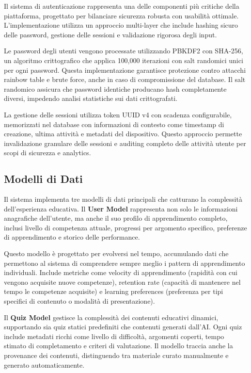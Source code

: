 \documentclass[12pt,a4paper]{article}
\begin{document}
Il sistema di autenticazione rappresenta una delle componenti più critiche della piattaforma, progettato per bilanciare sicurezza robusta con usabilità ottimale. L'implementazione utilizza un approccio multi-layer che include hashing sicuro delle password, gestione delle sessioni e validazione rigorosa degli input.

Le password degli utenti vengono processate utilizzando PBKDF2 con SHA-256, un algoritmo crittografico che applica 100,000 iterazioni con salt randomici unici per ogni password. Questa implementazione garantisce protezione contro attacchi rainbow table e brute force, anche in caso di compromissione del database. Il salt randomico assicura che password identiche producano hash completamente diversi, impedendo analisi statistiche sui dati crittografati.

La gestione delle sessioni utilizza token UUID v4 con scadenza configurabile, memorizzati nel database con informazioni di contesto come timestamp di creazione, ultima attività e metadati del dispositivo. Questo approccio permette invalidazione granulare delle sessioni e auditing completo delle attività utente per scopi di sicurezza e analytics.

\subsection{Modelli di Dati}

Il sistema implementa tre modelli di dati principali che catturano la complessità dell'esperienza educativa. Il \textbf{User Model} rappresenta non solo le informazioni anagrafiche dell'utente, ma anche il suo profilo di apprendimento completo, inclusi livello di competenza attuale, progressi per argomento specifico, preferenze di apprendimento e storico delle performance.

Questo modello è progettato per evolversi nel tempo, accumulando dati che permettono al sistema di comprendere sempre meglio i pattern di apprendimento individuali. Include metriche come velocity di apprendimento (rapidità con cui vengono acquisite nuove competenze), retention rate (capacità di mantenere nel tempo le competenze acquisite) e learning preferences (preferenza per tipi specifici di contenuto o modalità di presentazione).

Il \textbf{Quiz Model} gestisce la complessità dei contenuti educativi dinamici, supportando sia quiz statici predefiniti che contenuti generati dall'AI. Ogni quiz include metadati ricchi come livello di difficoltà, argomenti coperti, tempo stimato di completamento e criteri di valutazione. Il modello traccia anche la provenance dei contenuti, distinguendo tra materiale curato manualmente e generato automaticamente.
\end{document}
